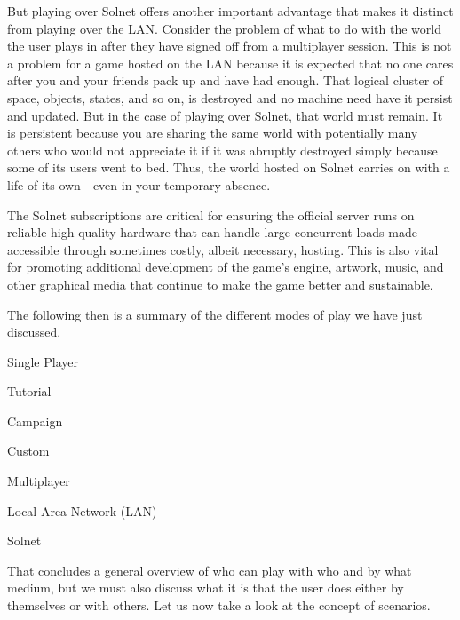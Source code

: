 But playing over Solnet offers another important advantage that makes it distinct from playing over the LAN. Consider the problem of what to do with the world the user plays in after they have signed off from a multiplayer session. This is not a problem for a game hosted on the LAN because it is expected that no one cares after you and your friends pack up and have had enough. That logical cluster of space, objects, states, and so on, is destroyed and no machine need have it persist and updated. But in the case of playing over Solnet, that world must remain. It is persistent because you are sharing the same world with potentially many others who would not appreciate it if it was abruptly destroyed simply because some of its users went to bed. Thus, the world hosted on Solnet carries on with a life of its own - even in your temporary absence.

The Solnet subscriptions are critical for ensuring the official server runs on reliable high quality hardware that can handle large concurrent loads made accessible through sometimes costly, albeit necessary, hosting. This is also vital for promoting additional development of the game's engine, artwork, music, and other graphical media that continue to make the game better and sustainable.

The following then is a summary of the different modes of play we have just discussed.

\startitemize[4]
    \item Single Player
        \startitemize[4]
        \item Tutorial
        \item Campaign
        \item Custom
        \stopitemize

    \item Multiplayer
        \startitemize[4]
        \item Local Area Network (LAN)
        \item Solnet
        \stopitemize
\stopitemize

That concludes a general overview of who can play with who and by what medium, but we must also discuss what it is that the user does either by themselves or with others. Let us now take a look at the concept of scenarios.

